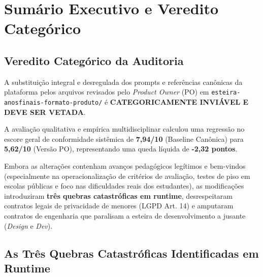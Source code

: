 \documentclass[11pt,a4paper]{article}
\begin{document}
\section{Sumário Executivo e Veredito Categórico}

\subsection{Veredito Categórico da Auditoria}

\begin{alertaCritico}
A substituição integral e desregulada dos prompts e referências canônicas da plataforma pelos arquivos revisados pelo \textit{Product Owner} (PO) em \texttt{esteira-anosfinais-formato-produto/} é \textbf{CATEGORICAMENTE INVIÁVEL E DEVE SER VETADA}.

A avaliação qualitativa e empírica multidisciplinar calculou uma regressão no escore geral de conformidade sistêmica de \textbf{7,94/10} (Baseline Canônica) para \textbf{5,62/10} (Versão PO), representando uma queda líquida de \textbf{-2,32 pontos}.

Embora as alterações contenham avanços pedagógicos legítimos e bem-vindos (especialmente na operacionalização de critérios de avaliação, testes de piso em escolas públicas e foco nas dificuldades reais dos estudantes), as modificações introduziram \textbf{três quebras catastróficas em runtime}, desrespeitaram contratos legais de privacidade de menores (LGPD Art. 14) e amputaram contratos de engenharia que paralisam a esteira de desenvolvimento a jusante (\textit{Design} e \textit{Dev}).
\end{alertaCritico}

\subsection{As Três Quebras Catastróficas Identificadas em Runtime}
\end{document}
